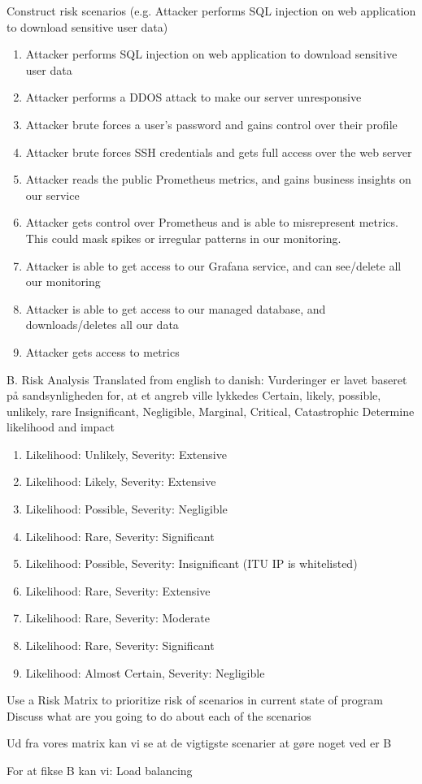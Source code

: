 Construct risk scenarios (e.g. Attacker performs SQL injection on web application to download sensitive user data)

\begin{enumerate}[label=\Alph*]
    \item Attacker performs SQL injection on web application to download sensitive user data
    \item Attacker performs a DDOS attack to make our server unresponsive
    \item Attacker brute forces a user’s password and gains control over their profile
    \item Attacker brute forces SSH credentials and gets full access over the web server
    \item Attacker reads the public Prometheus metrics, and gains business insights on our service
    \item Attacker gets control over Prometheus and is able to misrepresent metrics. This could mask spikes or irregular patterns in our monitoring.
    \item Attacker is able to get access to our Grafana service, and can see/delete all our monitoring
    \item Attacker is able to get access to our managed database, and downloads/deletes all our data
    \item Attacker gets access to metrics
\end{enumerate}


\noindent B. Risk Analysis
Translated from english to danish: Vurderinger er lavet baseret på sandsynligheden for, at et angreb ville lykkedes
Certain, likely, possible, unlikely, rare
Insignificant, Negligible, Marginal, Critical, Catastrophic
Determine likelihood and impact

\begin{enumerate}[label=\Alph*]
    \item Likelihood: Unlikely, Severity: Extensive
    \item Likelihood: Likely, Severity: Extensive
    \item Likelihood: Possible, Severity: Negligible
    \item Likelihood: Rare, Severity: Significant
    \item Likelihood: Possible, Severity: Insignificant (ITU IP is whitelisted)
    \item Likelihood: Rare, Severity: Extensive
    \item Likelihood: Rare, Severity: Moderate 
    \item Likelihood: Rare, Severity: Significant
    \item Likelihood: Almost Certain, Severity: Negligible		
\end{enumerate}

Use a Risk Matrix to prioritize risk of scenarios in current state of program
Discuss what are you going to do about each of the scenarios

Ud fra vores matrix kan vi se at de vigtigste scenarier at gøre noget ved er B

For at fikse B kan vi:
Load balancing